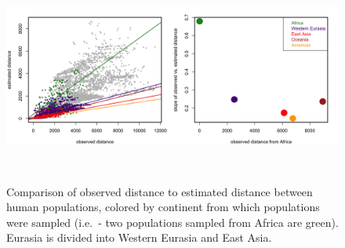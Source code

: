 \documentclass[12pt]{article}
\begin{document}
\clearpage

\begin{figure}
	\centering
		{\includegraphics[width=6in,height=2.5in]{figs/globetrotter/globe_NoAd_dist_decay.png}} %
	\caption{Comparison of observed distance to estimated distance between human populations, colored by continent from which populations were sampled (i.e.\ - two populations sampled from Africa are green).  Eurasia is divided into Western Eurasia and East Asia.}
\label{sfig:globe_noad_distcomp}
\end{figure}

\clearpage
\end{document}
